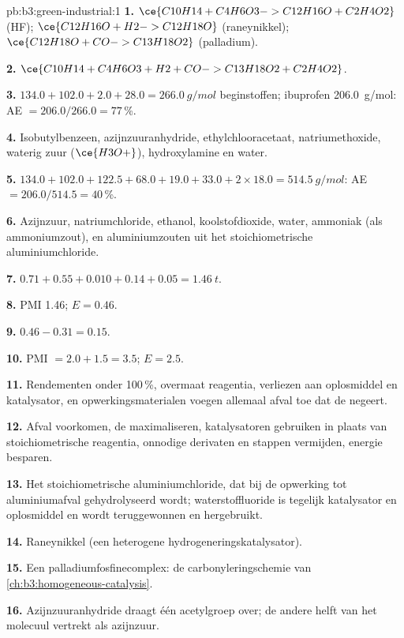 \begin{solution}{pb:b3:green-industrial:1}
\textbf{1.} $\ce{C10H14 + C4H6O3 -> C12H16O + C2H4O2}$ (HF); $\ce{C12H16O + H2 -> C12H18O}$ (raneynikkel);
$\ce{C12H18O + CO -> C13H18O2}$ (palladium).

\textbf{2.} $\ce{C10H14 + C4H6O3 + H2 + CO -> C13H18O2 + C2H4O2}$.

\textbf{3.} $134.0 + 102.0 + 2.0 + 28.0 = \qty{266.0}{g/mol}$ beginstoffen; ibuprofen \qty{206.0}{g/mol}: AE $= 206.0/266.0 = 77$\,\%.

\textbf{4.} Isobutylbenzeen, azijnzuuranhydride, ethylchlooracetaat,
natriumethoxide, waterig zuur ($\ce{H3O+}$), hydroxylamine en water.

\textbf{5.} $134.0 + 102.0 + 122.5 + 68.0 + 19.0 + 33.0 + 2 \times 18.0 = \qty{514.5}{g/mol}$: AE $= 206.0/514.5 = 40$\,\%.

\textbf{6.} Azijnzuur, natriumchloride, ethanol, koolstofdioxide, water,
ammoniak (als ammoniumzout), en aluminiumzouten uit het
stoichiometrische aluminiumchloride.

\textbf{7.} $0.71 + 0.55 + 0.010 + 0.14 + 0.05 = \qty{1.46}{t}$.

\textbf{8.} PMI 1.46; $E = 0.46$.

\textbf{9.} $0.46 - 0.31 = 0.15$.

\textbf{10.} PMI $= 2.0 + 1.5 = 3.5$; $E = 2.5$.

\textbf{11.} Rendementen onder 100\,\%, overmaat reagentia, verliezen aan
oplosmiddel en katalysator, en opwerkingsmaterialen voegen allemaal afval
toe dat de  negeert.

\textbf{12.} Afval voorkomen, de  maximaliseren, katalysatoren
gebruiken in plaats van stoichiometrische reagentia, onnodige derivaten
en stappen vermijden, energie besparen.

\textbf{13.} Het stoichiometrische aluminiumchloride, dat bij de opwerking
tot aluminiumafval gehydrolyseerd wordt; waterstoffluoride is tegelijk
katalysator en oplosmiddel en wordt teruggewonnen en hergebruikt.

\textbf{14.} Raneynikkel (een heterogene hydrogeneringskatalysator).

\textbf{15.} Een palladiumfosfinecomplex: de carbonyleringschemie van
\cref{ch:b3:homogeneous-catalysis}.

\textbf{16.} Azijnzuuranhydride draagt één acetylgroep over; de andere
helft van het molecuul vertrekt als azijnzuur.


\end{solution}
